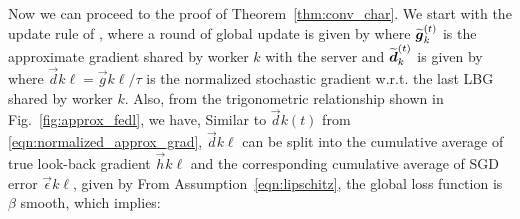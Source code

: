 Now we can proceed to the proof of Theorem~\ref{thm:conv_char}. We start with the update rule of {\algName}, where a round of global update is given by
where $\widetilde{\boldsymbol{g}}_{k}^{(t)}$ is the approximate gradient shared by worker $k$ with the server and $\widetilde{\boldsymbol{d}}_{k}^{(t)}$ is given by
where $\vec{d}{k}{\ell}=\vec{g}{k}{\ell}/\tau$ is the normalized stochastic gradient w.r.t. the last LBG shared by worker $k$. Also, from the trigonometric relationship shown in Fig.~\ref{fig:approx_fedl}, we have,
Similar to $ \vec{d}{k}{(t)}$ from \eqref{eqn:normalized_approx_grad},  $\vec{d}{k}{\ell}$ can be split into the cumulative average of true look-back gradient $\vec{h}{k}{\ell}$ and the corresponding cumulative average of SGD error $\vec{\epsilon}{k}{\ell}$, given by
From Assumption~\eqref{eqn:lipschitz}, the global loss function is $\beta$ smooth, which implies:

